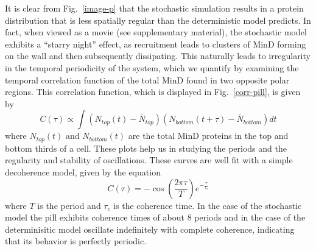 \documentclass[letterpaper,twocolumn,amsmath,amssymb,pre]{revtex4-1}
\begin{document}
It is clear from Fig.~\ref{image-p} that the stochastic simulation
results in a protein distribution that is less spatially regular than
the deterministic model predicts.  In fact, when viewed as a movie
(see supplementary material), the stochastic model exhibits a ``starry
night'' effect, as recruitment leads to clusters of MinD forming on
the wall and then subsequently dissipating.  This naturally leads to
irregularity in the temporal periodicity of the system, which we
quantify by examining the temporal correlation function of the total
MinD found in two opposite polar regions.
%
This correlation function, which is displayed in Fig.~\ref{corr-pill},
is given by
\begin{equation}
  C(\tau) \propto \int
  (N_{\textit{top}}(t) - \bar N_{\textit{top}})
  (N_{\textit{bottom}}(t+\tau) - \bar N_{\textit{bottom}})dt
\end{equation}
where $N_{\textit{top}}(t)$ and $N_{\textit{bottom}}(t)$ are the total
MinD proteins in the top and bottom thirds of a cell.  These plots
help us in studying the periods and the regularity and stability of
oscillations.  These curves are well fit with a simple decoherence
model, given by the equation
\begin{equation}
  C(\tau) = -\cos\left(\frac{2\pi\tau}{T}\right) e^{-\frac{\tau}{\tau_c}}
\end{equation}
where $T$ is the period and $\tau_c$ is the coherence time.  In the
case of the stochastic model the pill exhibits coherence times of
about 8 periods and in the case of the determinisitic model oscillate
indefinitely with complete coherence, indicating that its behavior is
perfectly periodic.
\end{document}
